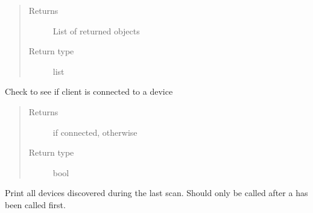 \documentclass[letterpaper,10pt,english]{sphinxmanual}
\begin{document}
\begin{fulllineitems}
\begin{fulllineitems}
\begin{quote}
\begin{description}
\begin{itemize}
\end{itemize}

\item[{Returns}] \leavevmode
List of returned  objects

\item[{Return type}] \leavevmode
list

\end{description}\end{quote}

\end{fulllineitems}


\begin{fulllineitems}
\label{\detokenize{simpleble:simpleble.SimpleBleClient.isConnected}}
Check to see if client is connected to a device
\begin{quote}\begin{description}
\item[{Returns}] \leavevmode
{} if connected,  otherwise

\item[{Return type}] \leavevmode
bool

\end{description}\end{quote}

\end{fulllineitems}


\begin{fulllineitems}
\label{\detokenize{simpleble:simpleble.SimpleBleClient.printFoundDevices}}
Print all devices discovered during the last scan. Should only be called after a {\hyperref[\detokenize{simpleble:simpleble.SimpleBleClient.scan}]{}} has been called first.

\end{fulllineitems}



\end{fulllineitems}
\end{document}
